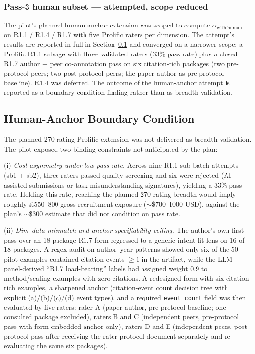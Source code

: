 \subsubsection{Pass-3 human subset --- attempted, scope reduced}
The pilot's planned human-anchor extension was scoped to compute $\alpha_{\text{with-human}}$ on R1.1 / R1.4 / R1.7 with five Prolific raters per dimension. The attempt's results are reported in full in Section~\ref{sec:results:limitations:specifiability} and converged on a narrower scope: a Prolific R1.1 salvage with three validated raters (33\% pass rate) plus a closed R1.7 author + peer co-annotation pass on six citation-rich packages (two pre-protocol peers; two post-protocol peers; the paper author as pre-protocol baseline). R1.4 was deferred. The outcome of the human-anchor attempt is reported as a boundary-condition finding rather than as breadth validation.

\subsection{Human-Anchor Boundary Condition}
\label{sec:results:limitations:specifiability}

The planned 270-rating Prolific extension was not delivered as breadth validation. The pilot exposed two binding constraints not anticipated by the plan:

(i) \emph{Cost asymmetry under low pass rate.} Across nine R1.1 sub-batch attempts (sb1 + sb2), three raters passed quality screening and six were rejected (AI-assisted submissions or task-misunderstanding signatures), yielding a 33\% pass rate. Holding this rate, reaching the planned 270-rating breadth would imply roughly £550--800 gross recruitment exposure ($\sim$\$700--1000 USD), against the plan's $\sim$\$300 estimate that did not condition on pass rate.

(ii) \emph{Dim--data mismatch and anchor specifiability ceiling.} The author's own first pass over an 18-package R1.7 form regressed to a generic intent-fit lens on 16 of 18 packages. A regex audit on author--year patterns showed only six of the 50 pilot examples contained citation events $\geq 1$ in the artifact, while the LLM-panel-derived ``R1.7 load-bearing'' labels had assigned weight 0.9 to method/scaling examples with zero citations. A redesigned form with six citation-rich examples, a sharpened anchor (citation-event count decision tree with explicit (a)/(b)/(c)/(d) event types), and a required \texttt{event\_count} field was then evaluated by five raters: rater A (paper author, pre-protocol baseline; one consulted package excluded), raters B and C (independent peers, pre-protocol pass with form-embedded anchor only), raters D and E (independent peers, post-protocol pass after receiving the rater protocol document separately and re-evaluating the same six packages).

